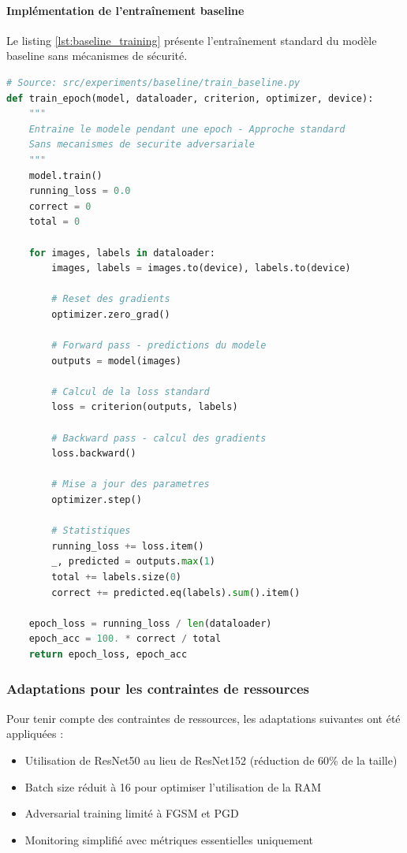 \paragraph{Implémentation de l'entraînement baseline}

Le listing \ref{lst:baseline_training} présente l'entraînement standard du modèle baseline sans mécanismes de sécurité.

\begin{lstlisting}[language=Python, caption={Entraînement baseline standard (source: src/experiments/baseline/train\_baseline.py)}, label={lst:baseline_training}, basicstyle=\ttfamily\footnotesize]
# Source: src/experiments/baseline/train_baseline.py
def train_epoch(model, dataloader, criterion, optimizer, device):
    """
    Entraine le modele pendant une epoch - Approche standard
    Sans mecanismes de securite adversariale
    """
    model.train()
    running_loss = 0.0
    correct = 0
    total = 0

    for images, labels in dataloader:
        images, labels = images.to(device), labels.to(device)

        # Reset des gradients
        optimizer.zero_grad()

        # Forward pass - predictions du modele
        outputs = model(images)

        # Calcul de la loss standard
        loss = criterion(outputs, labels)

        # Backward pass - calcul des gradients
        loss.backward()

        # Mise a jour des parametres
        optimizer.step()

        # Statistiques
        running_loss += loss.item()
        _, predicted = outputs.max(1)
        total += labels.size(0)
        correct += predicted.eq(labels).sum().item()

    epoch_loss = running_loss / len(dataloader)
    epoch_acc = 100. * correct / total
    return epoch_loss, epoch_acc
\end{lstlisting}

\subsubsection{Adaptations pour les contraintes de ressources}

Pour tenir compte des contraintes de ressources, les adaptations suivantes ont été appliquées :

\begin{itemize}
    \item Utilisation de ResNet50 au lieu de ResNet152 (réduction de 60\% de la taille)
    \item Batch size réduit à 16 pour optimiser l'utilisation de la RAM
    \item Adversarial training limité à FGSM et PGD
    \item Monitoring simplifié avec métriques essentielles uniquement
\end{itemize}


